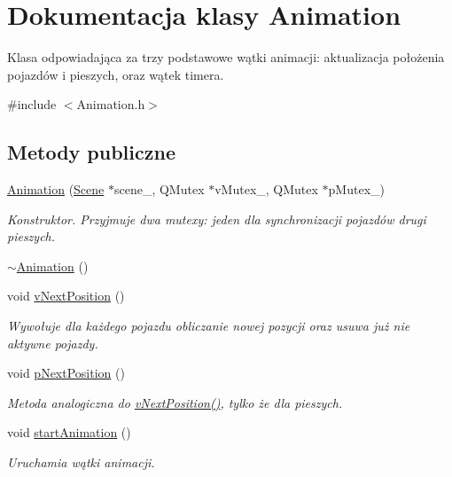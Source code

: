 \hypertarget{class_animation}{\section{Dokumentacja klasy Animation}
\label{class_animation}
}


Klasa odpowiadająca za trzy podstawowe wątki animacji\-: aktualizacja położenia pojazdów i pieszych, oraz wątek timera.  




{\ttfamily \#include $<$Animation.\-h$>$}

\subsection*{Metody publiczne}
\begin{DoxyCompactItemize}
\item 
\hyperlink{class_animation_a068fa331baa85ea3e1ee72bd009a2972}{Animation} (\hyperlink{class_scene}{Scene} $\ast$scene\-\_\-, Q\-Mutex $\ast$v\-Mutex\-\_\-, Q\-Mutex $\ast$p\-Mutex\-\_\-)
\begin{DoxyCompactList}\small\item\em Konstruktor. Przyjmuje dwa mutexy\-: jeden dla synchronizacji pojazdów drugi pieszych. \end{DoxyCompactList}\item 
\hyperlink{class_animation_a401b68793d4fbf48d481c030ee4b2a16}{$\sim$\-Animation} ()
\item 
void \hyperlink{class_animation_a520325c807ae2abcf4a6d2b9f6f9a350}{v\-Next\-Position} ()
\begin{DoxyCompactList}\small\item\em Wywołuje dla każdego pojazdu obliczanie nowej pozycji oraz usuwa już nie aktywne pojazdy. \end{DoxyCompactList}\item 
void \hyperlink{class_animation_a86842c0474c5c9ac0040d8eca1988b6a}{p\-Next\-Position} ()
\begin{DoxyCompactList}\small\item\em Metoda analogiczna do \hyperlink{class_animation_a520325c807ae2abcf4a6d2b9f6f9a350}{v\-Next\-Position()}, tylko że dla pieszych. \end{DoxyCompactList}\item 
void \hyperlink{class_animation_a5e42f1e3474b8c2d9a48e0f27d1e6825}{start\-Animation} ()
\begin{DoxyCompactList}\small\item\em Uruchamia wątki animacji. \end{DoxyCompactList}\item 

\end{DoxyCompactItemize}
